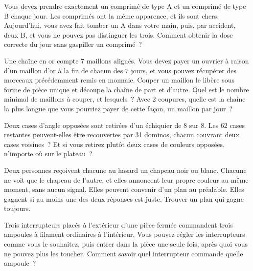 \begin{question}\label{iq:iv1:logic-riddles:5}
Vous devez prendre exactement un comprimé de type A et un comprimé de type B chaque jour. Les comprimés ont la même apparence, et ils sont chers. Aujourd'hui, vous avez fait tomber un A dans votre main, puis, par accident, deux B, et vous ne pouvez pas distinguer les trois. Comment obtenir la dose correcte du jour sans gaspiller un comprimé~?
\end{question}

\begin{question}\label{iq:iv1:logic-riddles:6}
Une chaîne en or compte 7 maillons alignés. Vous devez payer un ouvrier à raison d'un maillon d'or à la fin de chacun des 7 jours, et vous pouvez récupérer des morceaux précédemment remis en monnaie. Couper un maillon le libère sous forme de pièce unique et découpe la chaîne de part et d'autre. Quel est le nombre minimal de maillons à couper, et lesquels~? Avec 2 coupures, quelle est la chaîne la plus longue que vous pourriez payer de cette façon, un maillon par jour~?
\end{question}

\begin{question}\label{iq:iv1:logic-riddles:7}
Deux cases d'angle opposées sont retirées d'un échiquier de 8 sur 8. Les 62 cases restantes peuvent-elles être recouvertes par 31 dominos, chacun couvrant deux cases voisines~? Et si vous retirez plutôt deux cases de couleurs opposées, n'importe où sur le plateau~?
\end{question}

\begin{question}\label{iq:iv1:logic-riddles:8}
Deux personnes reçoivent chacune au hasard un chapeau noir ou blanc. Chacune ne voit que le chapeau de l'autre, et elles annoncent leur propre couleur au même moment, sans aucun signal. Elles peuvent convenir d'un plan au préalable. Elles gagnent si au moins une des deux réponses est juste. Trouver un plan qui gagne toujours.
\end{question}

\begin{question}\label{iq:iv1:logic-riddles:9}
Trois interrupteurs placés à l'extérieur d'une pièce fermée commandent trois ampoules à filament ordinaires à l'intérieur. Vous pouvez régler les interrupteurs comme vous le souhaitez, puis entrer dans la pièce une seule fois, après quoi vous ne pouvez plus les toucher. Comment savoir quel interrupteur commande quelle ampoule~?
\end{question}

